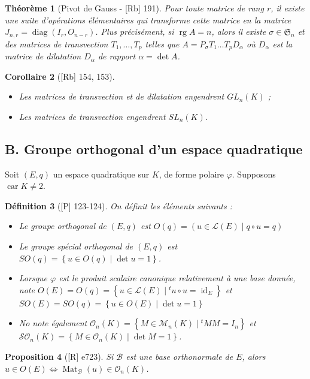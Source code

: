 \documentclass[10pt, a4paper, parskip=full, twoside, twocolumn]{report}
\newtheorem{definition}{Définition}
\newtheorem{theorem}[definition]{Théorème}
\newtheorem{proposition}[definition]{Proposition}
\newtheorem{corollary}[definition]{Corollaire}
\newcommand{\M}{\mathcal{M}}
\newcommand{\B}{\mathcal{B}}
\DeclareMathOperator{\rg}{rg}
\DeclareMathOperator{\Mat}{Mat}
\DeclareMathOperator{\id}{id}
\DeclareMathOperator{\diag}{diag}
\DeclareMathOperator{\car}{car}
\begin{document}
\begin{theorem}[Pivot de Gauss - \textnormal{[Rb] 191}]
	Pour toute matrice de rang $r$, il existe une suite d'opérations élémentaires qui transforme cette matrice en la matrice $J_{n,r} = \diag(I_r, O_{n-r})$.
	Plus précisément, si $\rg A = n$, alors il existe $\sigma\in\mathfrak{S}_n$ et des matrices de transvection $T_1, \dots, T_p$ telles que $A = P_{\sigma}T_1\dots T_p D_{\alpha}$ où $D_{\alpha}$ est la matrice de dilatation $D_{\alpha}$ de rapport $\alpha = \det A$.
\end{theorem}

\begin{corollary}[\textnormal{[Rb] 154, 153}]
	\begin{itemize}
		\item Les matrices de transvection et de dilatation engendrent $GL_n(K)$ ;
		\item Les matrices de transvection engendrent $SL_n(K)$.
	\end{itemize}
\end{corollary}

\subsection*{B. Groupe orthogonal d'un espace quadratique}
\textcolor{paragraphtext}{Soit $(E,q)$ un espace quadratique sur $K$, de forme polaire $\varphi$. Supposons $\car K \neq 2$.}
\begin{definition}[\textnormal{[P] 123-124}]
	On définit les éléments suivants :
	\begin{itemize}
		\item Le \emph{groupe orthogonal de $(E,q)$} est $O(q) = \left(u\in\mathcal{L}(E)\mid q\circ u=q\right)$
		\item Le \emph{groupe spécial orthogonal de $(E,q)$} est $SO(q) = \left\{u\in O(q)\mid \det u = 1\right\}$.
		\item Lorsque $\varphi$ est le produit scalaire canonique relativement à une base donnée, note $O(E) = O(q)=\left\{u\in\mathcal{L}(E)\mid {}^tu\circ u =\id_E\right\}$ et $SO(E)=SO(q)=\left\{u\in O(E)\mid \det u = 1 \right\}$
		\item No note également $\mathcal{O}_n(K) =\left\{M\in\M_n(K)\mid {}^tMM=I_n\right\}$ et $\mathcal{SO}_n(K)=\left\{M\in\mathcal{O}_n(K)\mid \det M = 1 \right\}$.
	\end{itemize}
\end{definition}

\begin{proposition}[\textnormal{[R] e723}]
	Si $\B$ est une base orthonormale de $E$, alors $u\in O(E)\iff\Mat_{\B}(u)\in\mathcal{O}_n(K)$.
\end{proposition}
\end{document}
